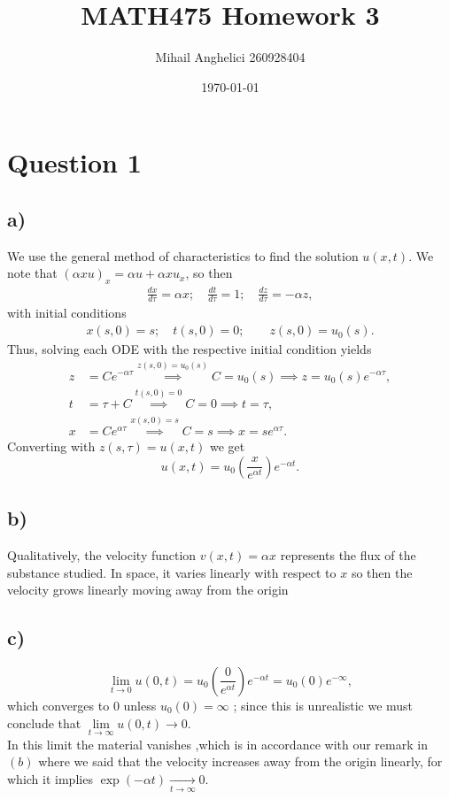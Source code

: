 \documentclass[12pt]{article}
\title{MATH475 Homework 3}
\author{Mihail Anghelici 260928404 }
\date{\today}
\theoremstyle{definition}
\theoremstyle{definition}
\theoremstyle{definition}
\theoremstyle{definition}
\theoremstyle{definition}
\theoremstyle{example}
\theoremstyle{note}
\theoremstyle{remark}
\theoremstyle{example}
\begin{document}
	\maketitle
			\section*{Question 1}
			\subsection*{a) }
			We use the general method of characteristics to find the solution $u(x,t)$. We note that $(\alpha x u)_{x} = \alpha u + \alpha x u_{x}$, so then
				\begin{align*}
				\frac{dx}{d\tau}= \alpha x ; \quad \frac{d t}{d\tau} = 1 ; \quad \frac{dz}{d \tau} = - \alpha z,
				\end{align*}
				with initial conditions 
				\begin{align*}
				x(s,0) = s ; \quad t(s,0) = 0; \qquad z(s,0) = u_{0}(s).
				\end{align*}
				Thus, solving each ODE with the respective initial condition yields
				\begin{align*}
				z &= Ce^{-\alpha \tau} \overset{z(s,0)= u_{0}(s)}{\implies} C =u_{0}(s) \implies z=u_{0}(s)e^{-\alpha \tau},\\
				t &= \tau +C \overset{t(s,0) = 0}{\implies } C =0  \implies t = \tau, \\
				x &= C e^{\alpha \tau} \overset{x(s,0) =s }{\implies } C =s \implies x = se^{\alpha \tau}. 
				\end{align*}
				Converting with $z(s,\tau) = u(x,t)$ we get
				$$ u(x,t) = u_{0} \left( \frac{x}{e^{\alpha t}}\right) e^{-\alpha t}.$$
			\subsection*{b) }
				Qualitatively, the velocity function $v(x,t) = \alpha x$ represents the flux of the substance studied. In space, it varies linearly with respect to $x$ so then the velocity grows linearly moving away from the origin
			\subsection*{c) }
			$$ \lim\limits_{t \to 0} u(0,t) = u_{0} \left( \frac{0}{e^{\alpha t}}\right)e^{-\alpha t} = u_{0}(0)e^{-\infty},$$	
			which converges to $0$ unless $u_{0}(0) = \infty$ ; since this is unrealistic we  must conclude that $\lim\limits_{t \to \infty} u(0,t) \to 0$. 
			\\
			\noindent  In this limit the material vanishes ,which is in accordance with our remark in $(b)$ where we said that the velocity increases away from the origin linearly, for which it implies $\exp(-\alpha t) \xrightarrow[t \to \infty]{} 0$.		
\end{document}
